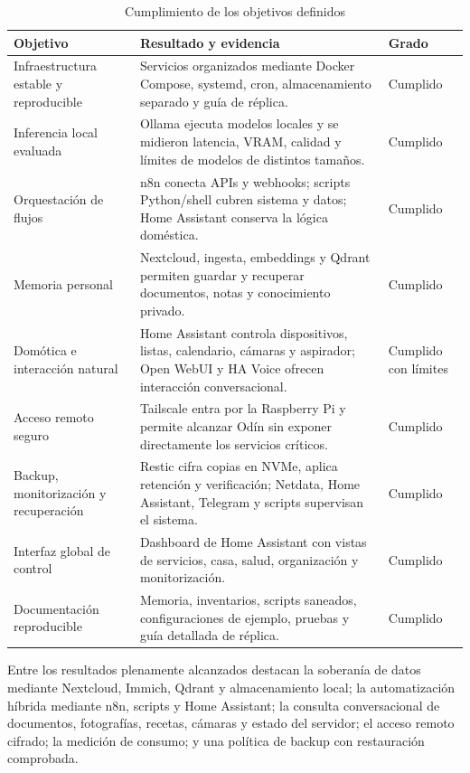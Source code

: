 \begin{table}[H]
  \centering
  \caption{Cumplimiento de los objetivos definidos}
  \label{tab:cumplimiento-objetivos}
  \small
  \begin{tabularx}{\textwidth}{
    >{\raggedright\arraybackslash}p{}
    >{\raggedright\arraybackslash}X
    >{\raggedright\arraybackslash}p{}}
    \toprule
    Objetivo & Resultado y evidencia & Grado \\
    \midrule
    Infraestructura estable y reproducible & Servicios organizados mediante Docker Compose, systemd, cron, almacenamiento separado y guía de réplica. & Cumplido \\
    Inferencia local evaluada & Ollama ejecuta modelos locales y se midieron latencia, VRAM, calidad y límites de modelos de distintos tamaños. & Cumplido \\
    Orquestación de flujos & n8n conecta APIs y webhooks; scripts Python/shell cubren sistema y datos; Home Assistant conserva la lógica doméstica. & Cumplido \\
    Memoria personal & Nextcloud, ingesta, embeddings y Qdrant permiten guardar y recuperar documentos, notas y conocimiento privado. & Cumplido \\
    Domótica e interacción natural & Home Assistant controla dispositivos, listas, calendario, cámaras y aspirador; Open WebUI y HA Voice ofrecen interacción conversacional. & Cumplido con límites \\
    Acceso remoto seguro & Tailscale entra por la Raspberry Pi y permite alcanzar Odín sin exponer directamente los servicios críticos. & Cumplido \\
    Backup, monitorización y recuperación & Restic cifra copias en NVMe, aplica retención y verificación; Netdata, Home Assistant, Telegram y scripts supervisan el sistema. & Cumplido \\
    Interfaz global de control & Dashboard de Home Assistant con vistas de servicios, casa, salud, organización y monitorización. & Cumplido \\
    Documentación reproducible & Memoria, inventarios, scripts saneados, configuraciones de ejemplo, pruebas y guía detallada de réplica. & Cumplido \\
    \bottomrule
  \end{tabularx}
\end{table}

Entre los resultados plenamente alcanzados destacan la soberanía de datos mediante Nextcloud, Immich, Qdrant y almacenamiento local; la automatización híbrida mediante n8n, scripts y Home Assistant; la consulta conversacional de documentos, fotografías, recetas, cámaras y estado del servidor; el acceso remoto cifrado; la medición de consumo; y una política de backup con restauración comprobada.

